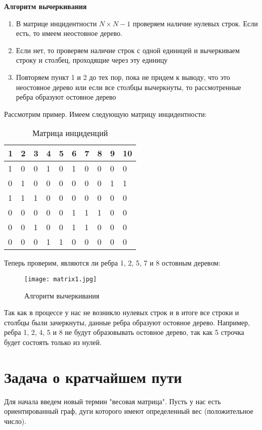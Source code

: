 \hspace{5mm}

\textbf{Алгоритм вычеркивания}
\begin{enumerate}
    \item В матрице инцидентности $N \times N-1$ проверяем наличие нулевых строк. 
    Если есть, то имеем неостовное дерево.
    \item Если нет, то проверяем наличие строк с одной единицей
    и вычеркиваем строку и столбец, проходящие через эту единицу
    \item Повторяем пункт 1 и 2 до тех пор, пока не придем к выводу, что это неостовное дерево или
    если все столбцы вычеркнуты, то рассмотренные ребра образуют остовное дерево
\end{enumerate}

Рассмотрим пример. Имеем следующую матрицу инцидентности:
\begin{table}[h]
    \centering
    \begin{tabular}[c]{ | l | l | l | l | l | l | l | l | l | l | }
        \hline
        1 & 2 & 3 & 4 & 5 & 6 & 7 & 8 & 9 & 10 \\ \hline
        1 & 0 & 0 & 1 & 0 & 1 & 0 & 0 & 0 & 0 \\ \hline
        0 & 1 & 0 & 0 & 0 & 0 & 0 & 0 & 1 & 1 \\ \hline
        1 & 1 & 1 & 0 & 0 & 0 & 0 & 0 & 0 & 0 \\ \hline
        0 & 0 & 0 & 0 & 0 & 1 & 1 & 1 & 0 & 0 \\ \hline
        0 & 0 & 1 & 0 & 0 & 1 & 1 & 0 & 0 & 0 \\ \hline
        0 & 0 & 0 & 1 & 1 & 0 & 0 & 0 & 0 & 0 \\ 
        \hline
    \end{tabular}
    \caption{Матрица инциденций}
\end{table}

Теперь проверим, являются ли ребра 1, 2, 5, 7 и 8 остовным деревом:
\begin{figure}[!h]
    \centering 
    \texttt{[image: matrix1.jpg]}
    \caption{Алгоритм вычеркивания}
\end{figure}

Так как в процессе у нас не возникло нулевых строк и в итоге все строки и столбцы 
были зачеркнуты, данные ребра образуют остовное дерево.
Например, ребра 1, 2, 4, 5 и 8 не будут образовывать остовное дерево, так как 5
строчка будет состоять только из нулей.

\section{Задача о кратчайшем пути}
Для начала введем новый термин "весовая матрица". Пусть у нас есть ориентированный граф,
дуги которого имеют определенный вес (положительное число). 

